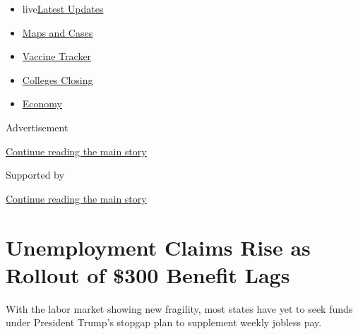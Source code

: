 \begin{itemize}
\tightlist
\item
  live\href{https://www.nytimes3xbfgragh.onion/2020/08/20/world/coronavirus-covid.html?name=styln-coronavirus-markets\&region=TOP_BANNER\&variant=undefined\&block=storyline_menu_recirc\&action=click\&pgtype=Article\&impression_id=86da1991-e384-11ea-8b08-6ddcf202df60}{Latest
  Updates}
\item
  \href{https://www.nytimes3xbfgragh.onion/interactive/2020/us/coronavirus-us-cases.html?name=styln-coronavirus-markets\&region=TOP_BANNER\&variant=undefined\&block=storyline_menu_recirc\&action=click\&pgtype=Article\&impression_id=86da1992-e384-11ea-8b08-6ddcf202df60}{Maps
  and Cases}
\item
  \href{https://www.nytimes3xbfgragh.onion/interactive/2020/science/coronavirus-vaccine-tracker.html?name=styln-coronavirus-markets\&region=TOP_BANNER\&variant=undefined\&block=storyline_menu_recirc\&action=click\&pgtype=Article\&impression_id=86da1993-e384-11ea-8b08-6ddcf202df60}{Vaccine
  Tracker}
\item
  \href{https://www.nytimes3xbfgragh.onion/2020/08/19/us/colleges-closing-covid.html?name=styln-coronavirus-markets\&region=TOP_BANNER\&variant=undefined\&block=storyline_menu_recirc\&action=click\&pgtype=Article\&impression_id=86da1994-e384-11ea-8b08-6ddcf202df60}{Colleges
  Closing}
\item
  \href{https://www.nytimes3xbfgragh.onion/live/2020/08/20/business/stock-market-today-coronavirus?name=styln-coronavirus-markets\&region=TOP_BANNER\&variant=undefined\&block=storyline_menu_recirc\&action=click\&pgtype=Article\&impression_id=86da1995-e384-11ea-8b08-6ddcf202df60}{Economy}
\end{itemize}

Advertisement

\protect\hyperlink{after-top}{Continue reading the main story}

Supported by

\protect\hyperlink{after-sponsor}{Continue reading the main story}

\hypertarget{unemployment-claims-rise-as-rollout-of-300-benefit-lags}{%
\section{Unemployment Claims Rise as Rollout of \$300 Benefit
Lags}\label{unemployment-claims-rise-as-rollout-of-300-benefit-lags}}

With the labor market showing new fragility, most states have yet to
seek funds under President Trump's stopgap plan to supplement weekly
jobless pay.

